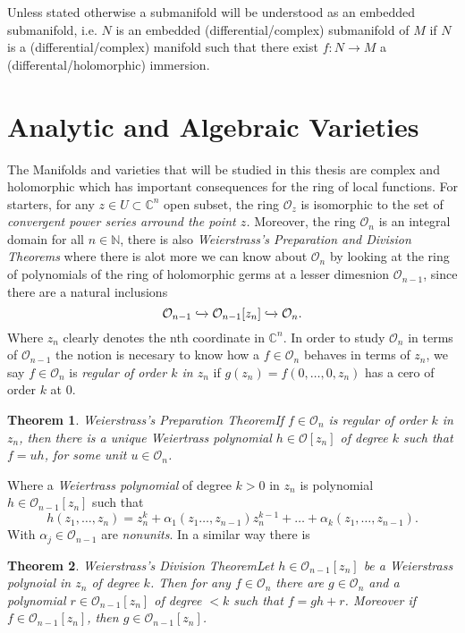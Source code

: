 \documentclass[12pt,twoside,a4paper]{report}
\newtheorem{theorem}{Theorem}[section]
\newcommand{\nat}{\ensuremath{ \mathbb N }}
\newcommand{\con}{\ensuremath{\mathbb{C}^n}}
\newcommand{\osheaf}{\ensuremath{\mathcal O }}
\begin{document}
Unless stated otherwise a submanifold will be understood as an embedded submanifold, i.e. $N$ is an embedded (differential/complex) submanifold of $M$ if $N$ is a (differential/complex) manifold such that there exist $f:N\rightarrow M$ a (differental/holomorphic) immersion.

\section{Analytic and Algebraic Varieties}
\noindent The Manifolds and varieties that will be studied in this thesis are complex and holomorphic which has important consequences for the ring of local functions. For starters, for any $z\in U\subset\con$ open subset, the ring $\osheaf_{z}$ is isomorphic to the set of \emph{convergent power series arround the point $z$.} Moreover, the ring $\osheaf_{n}$ is an integral domain for all $n\in\nat$, there is also \emph{Weierstrass's Preparation and Division Theorems} where there is alot more we can know about $\osheaf_{n}$ by looking at the ring of polynomials of the ring of holomorphic germs at a lesser dimesnion $\osheaf_{n-1}$, since there are a natural inclusions
\[
  \osheaf_{n-1}\xhookrightarrow{}\osheaf_{n-1}[z_{n}]\xhookrightarrow{}\osheaf_{n}.
\]
Where $z_{n}$ clearly denotes the nth coordinate in $\con$. In order to study $\osheaf_{n}$ in terms of $\osheaf_{n-1}$ the notion is necesary to know how a $f\in\osheaf_{n}$ behaves in terms of $z_{n}$, we say $f\in\osheaf_{n}$ is \emph{regular of order $k$ in $z_{n}$} if $g(z_{n})=f(0,\dots,0,z_{n})$ has a cero of order $k$ at $0$.
\begin{theorem}{Weierstrass's Preparation Theorem}\label{weier-prep}
If $f\in\osheaf_{n}$ is regular of order $k$ in $z_{n}$, then there is a unique \emph{Weiertrass polynomial} $h\in\osheaf[z_{n}]$ of degree $k$ such that $f=uh$, for some unit $u\in\osheaf_{n}$.
\end{theorem}
Where a \emph{Weiertrass polynomial} of degree $k>0$ in $z_{n}$ is polynomial $h\in\osheaf_{n-1}[z_{n}]$ such that
\[
  h(z_{1},\dots,z_{n})=z_{n}^{k}+\alpha_{1}(z_{1}\dots,z_{n-1})z_{n}^{k-1}+\dots+\alpha_{k}(z_{1},\dots,z_{n-1}).
\]
With $\alpha_{j}\in\osheaf_{n-1}$ are \emph{nonunits}. In a similar way there is
\begin{theorem}{Weierstrass's Division Theorem}\label{weier-div}
  Let $h\in\osheaf_{n-1}[z_{n}]$ be a \emph{Weierstrass polynoial in $z_{n}$} of degree $k$. Then for any $f\in\osheaf_{n}$ there are $g\in\osheaf_{n}$ and a polynomial $r\in\osheaf_{n-1}[z_{n}]$ of degree $<k$ such that $f=gh+r$. Moreover if $f\in\osheaf_{n-1}[z_{n}]$, then $g\in\osheaf_{n-1}[z_{n}]$.
\end{theorem}
\end{document}
